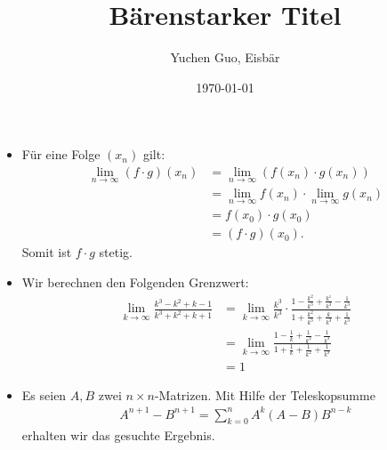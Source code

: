 \documentclass{article}
\title{Bärenstarker Titel}
\author{Yuchen Guo, Eisbär}
\date{\today}
\begin{document}
\maketitle
\tableofcontents

\begin{itemize}
\item Für eine Folge $(x_{n})$ gilt:
  \begin{align*}
    \lim_{n \to \infty}(f \cdot g)(x_{n})
    &= \lim_{n \to \infty} ( f(x_{n}) \cdot g(x_{n})) \\
    &= \lim_{n \to \infty}f(x_{n}) \cdot \lim_{n \to \infty}g(x_{n}) \\
    &= f(x_{0}) \cdot g(x_{0}) \\
    &= (f \cdot g)(x_{0}).
  \end{align*}
  Somit ist $f \cdot g$ stetig.
\item Wir berechnen den Folgenden Grenzwert:
  \begin{align}
    \lim_{k \to \infty}\frac{k^{3}-k^{2}+k-1}{k^{3}+k^{2}+k+1}
    &= \lim_{k \to \infty} \frac{k^{3}}{k^{3}} \cdot \frac{1 -
      \frac{k^{2}}{k^{3}} + \frac{k^{1}}{k^{3}} - \frac{1}{k^{3}}}{1 +
      \frac{k^{2}}{k^{3}} + \frac{k}{k^{3}}+\frac{1}{k^{3}}} \\
    &= \lim_{k \to \infty}\frac{1- \frac{1}{k} + \frac{1}{k^{2}} -
      \frac{1}{k^{3}}}{1+\frac{1}{k} + \frac{1}{k^{2}} +
      \frac{1}{k^{3}}} \\
    &= 1
  \end{align}
\item Es seien $A, B$ zwei $n \times n$-Matrizen.  Mit Hilfe der
  Teleskopsumme
  \begin{align*}
    A^{n+1} - B^{n+1} = \sum_{k=0}^{n}A^{k}(A - B)B^{n-k} \tag{TKS}
  \end{align*}
  erhalten wir das gesuchte Ergebnis.
\end{itemize}
\end{document}
